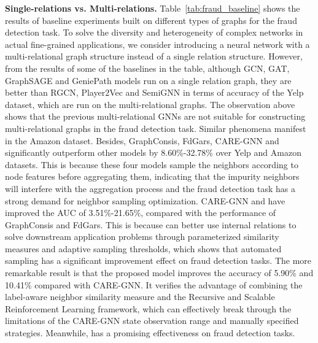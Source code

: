 \textbf{Single-relations vs. Multi-relations. }
Table~\ref{tab:fraud_baseline} shows the results of baseline experiments built on different types of graphs for the fraud detection task.
To solve the diversity and heterogeneity of complex networks in actual fine-grained applications, we consider introducing a neural network with a multi-relational graph structure instead of a single relation structure.
However, from the results of some of the baselines in the table, although GCN, GAT, GraphSAGE and GeniePath models run on a single relation graph, they are better than RGCN, Player2Vec and SemiGNN in terms of accuracy of the Yelp dataset, which are run on the multi-relational graphs.
The observation above shows that the previous multi-relational GNNs are not suitable for  constructing multi-relational graphs in the fraud detection task.
Similar phenomena manifest in the Amazon dataset.
Besides, GraphConsis, FdGars, CARE-GNN and \RioGNN significantly outperform other models by 8.60\%-32.78\% over Yelp and Amazon datasets. 
This is because these four models sample the neighbors according to node features before aggregating them, indicating that the impurity neighbors will interfere with the aggregation process and the fraud detection task has a strong demand for neighbor sampling optimization.
CARE-GNN and \RioGNN have improved the AUC of 3.51\%-21.65\%, compared with the performance of GraphConsis and FdGars.
This is because \RioGNN can better use internal relations to solve downstream application problems through parameterized similarity measures and adaptive sampling thresholds, which shows that automated sampling has a significant improvement effect on fraud detection tasks.
The more remarkable result is that the proposed \RioGNN model improves the accuracy of 5.90\% and 10.41\% compared with CARE-GNN.
It verifies the advantage of combining the label-aware neighbor similarity measure and the Recursive and Scalable Reinforcement Learning framework, which can effectively break through the limitations of the CARE-GNN state observation range and manually specified strategies.
Meanwhile, \RioGNN has a promising effectiveness on fraud detection tasks.

